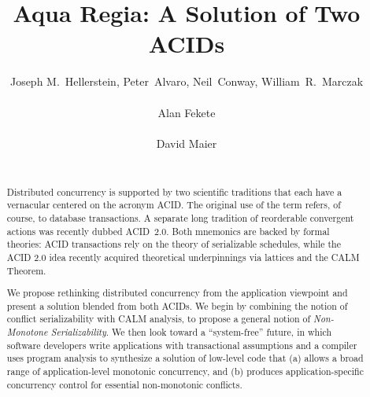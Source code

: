 \documentclass{sig-alternate}
\begin{document}

\title{{\ttlit Aqua Regia}: A Solution of Two ACIDs}
\author{
\alignauthor
Joseph M.~Hellerstein, Peter~Alvaro, Neil~Conway, William~R.~Marczak\\
       \\
\alignauthor
Alan Fekete\\
       \\
\alignauthor
David Maier\\
       \\
}

\maketitle
\begin{abstract}
  Distributed concurrency is supported by two scientific traditions that each
  have a vernacular centered on the acronym \textsf{ACID}.  The original use of
  the term refers, of course, to database transactions. A separate long
  tradition of reorderable convergent actions was recently dubbed
  \textsf{ACID~2.0}.  Both mnemonics are backed by formal theories:
  ACID transactions rely on the theory of serializable schedules, while the ACID
  2.0 idea recently acquired theoretical underpinnings via lattices and the CALM
  Theorem.

  We propose rethinking distributed concurrency from the application viewpoint
  and present a solution blended from both ACIDs.  We begin by combining the
  notion of conflict serializability with CALM analysis, to propose a general
  notion of \emph{Non-Monotone Serializability}.  We then look toward a
  ``system-free'' future, in which software developers write applications with
  transactional assumptions and a compiler uses program analysis to synthesize a
  solution of low-level code that (a) allows a broad range of application-level
  monotonic concurrency, and (b) produces application-specific concurrency
  control for essential non-monotonic conflicts.
\end{abstract}
\end{document}
